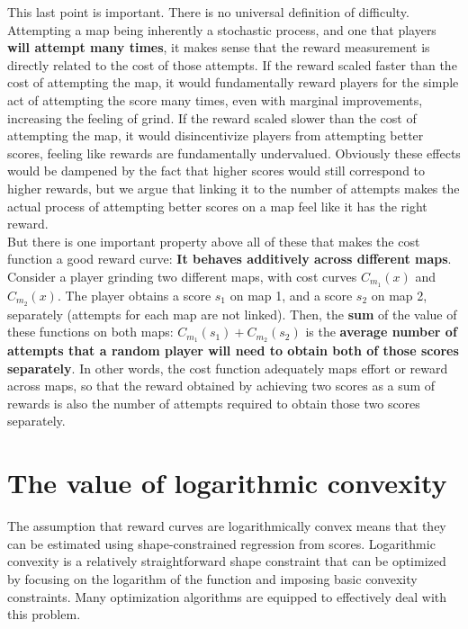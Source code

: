 \documentclass[12pt,a4paper]{article}
\begin{document}
This last point is important. There is no universal definition of difficulty. Attempting a map being inherently a stochastic process, and one that players {\bf{will attempt many times}}, it makes sense that the reward measurement is directly related to the cost of those attempts. If the reward scaled faster than the cost of attempting the map, it would fundamentally reward players for the simple act of attempting the score many times, even with marginal improvements, increasing the feeling of grind. If the reward scaled slower than the cost of attempting the map, it would disincentivize players from attempting better scores, feeling like rewards are fundamentally undervalued. Obviously these effects would be dampened by the fact that higher scores would still correspond to higher rewards, but we argue that linking it to the number of attempts makes the actual process of attempting better scores on a map feel like it has the right reward.\\

But there is one important property above all of these that makes the cost function a good reward curve: {\bf{It behaves additively across different maps}}. Consider a player grinding two different maps, with cost curves $C_{m_1}(x)$ and $C_{m_2}(x)$. The player obtains a score $s_1$ on map 1, and a score $s_2$ on map 2, separately (attempts for each map are not linked). Then, the {\bf{sum}} of the value of these functions on both maps: $C_{m_1}(s_1) + C_{m_2}(s_2)$ is the {\bf{average number of attempts that a random player will need to obtain both of those scores separately}}. In other words, the cost function adequately maps effort or reward across maps, so that the reward obtained by achieving two scores as a sum of rewards is also the number of attempts required to obtain those two scores separately.\\

\section{The value of logarithmic convexity}

The assumption that reward curves are logarithmically convex means that they can be estimated using shape-constrained regression from scores. Logarithmic convexity is a relatively straightforward shape constraint that can be optimized by focusing on the logarithm of the function and imposing basic convexity constraints. Many optimization algorithms are equipped to effectively deal with this problem.
\end{document}
